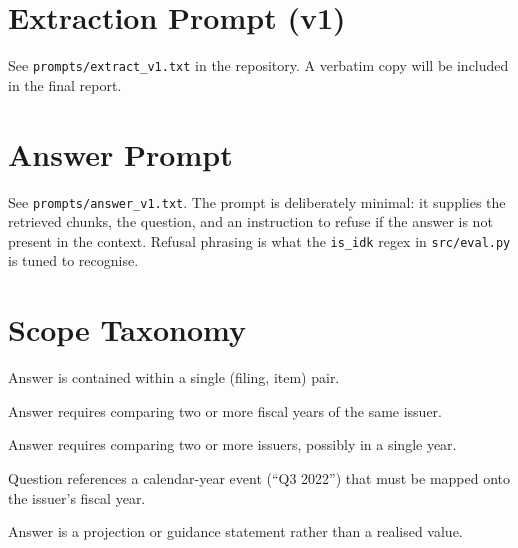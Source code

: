 \documentclass[11pt]{article}
\begin{document}


\appendix

\section{Extraction Prompt (v1)}
\label{app:extract}
See \texttt{prompts/extract\_v1.txt} in the repository. A verbatim
copy will be included in the final report.

\section{Answer Prompt}
\label{app:answer}
See \texttt{prompts/answer\_v1.txt}. The prompt is deliberately
minimal: it supplies the retrieved chunks, the question, and an
instruction to refuse if the answer is not present in the context.
Refusal phrasing is what the \texttt{is\_idk} regex in
\texttt{src/eval.py} is tuned to recognise.

\section{Scope Taxonomy}
\label{app:scope}
\begin{description}
\itemsep 0pt \parskip 0pt
\item[intra] Answer is contained within a single (filing, item) pair.
\item[inter\_year] Answer requires comparing two or more fiscal years
  of the same issuer.
\item[cross\_company] Answer requires comparing two or more issuers,
  possibly in a single year.
\item[fiscal\_vs\_calendar] Question references a calendar-year event
  (``Q3 2022'') that must be mapped onto the issuer's fiscal year.
\item[forward\_looking] Answer is a projection or guidance statement
  rather than a realised value.
\end{description}
\end{document}
